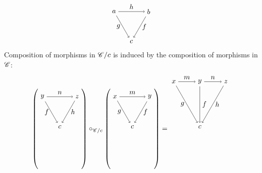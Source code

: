 \documentclass[12pt]{article}
\theoremstyle{definition}
\theoremstyle{remark}
\begin{document}
\[
    \begin{tikzpicture}
        \draw (150:1) node(tl){$a$};
        \draw ( 30:1) node(tr){$b$};
        \draw (270:1)node(bm){$c$};

        \draw[->] (tl) to node[below,left ]{$g$} (bm);
        \draw[->] (tr) to node[below,right]{$f$} (bm);

        \draw[->] (tl) to node[above]{$h$} (tr);
    \end{tikzpicture}
\]
Composition of morphisms in $\mathscr{C}/c$ is induced by the composition of morphisms in $\mathscr{C}$:
\[
    \left(
    \begin{tikzpicture}
        \draw (150:1) node(tl){$y$};
        \draw ( 30:1) node(tr){$z$};
        \draw (270:1) node(bm){$c$};

        \draw[->] (tl) to node[below,left ]{$f$} (bm);
        \draw[->] (tr) to node[below,right]{$h$} (bm);

        \draw[->] (tl) to node[above]{$n$} (tr);
    \end{tikzpicture}
    \right)
    \circ_{\catC/c}
    \left(
    \begin{tikzpicture}
        \draw (150:1) node(tl){$x$};
        \draw ( 30:1) node(tr){$y$};
        \draw (270:1) node(bm){$c$};

        \draw[->] (tl) to node[below,left ]{$g$} (bm);
        \draw[->] (tr) to node[below,right]{$f$} (bm);

        \draw[->] (tl) to node[above]{$m$} (tr);
    \end{tikzpicture}
    \right)
    =
    \begin{tikzpicture}
        \draw (150:1.5) node(tl){$x$};
        \draw ( 90:0.75) node(tm){$y$};
        \draw ( 30:1.5) node(tr){$z$};
        \draw (270:1.5) node(bm){$c$};

        \draw[->] (tl) to node[below,left ]{$g$} (bm);
        \draw[->] (tm) to node[right]{$f$} (bm);
        \draw[->] (tr) to node[below,right]{$h$} (bm);

        \draw[->] (tl) to node[above]{$m$} (tm);
        \draw[->] (tm) to node[above]{$n$} (tr);
    \end{tikzpicture}
\]
\end{document}
